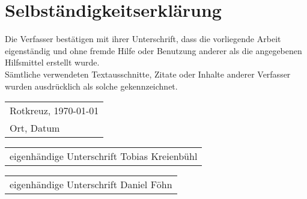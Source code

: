 \clearpage
\thispagestyle{empty}
\section*{Selbständigkeitserklärung}
Die Verfasser bestätigen mit ihrer Unterschrift, dass die vorliegende Arbeit eigenständig und ohne fremde Hilfe oder Benutzung anderer als die angegebenen Hilfsmittel erstellt wurde.\\Sämtliche verwendeten Textausschnitte, Zitate oder Inhalte anderer Verfasser wurden ausdrücklich als solche gekennzeichnet.

\vspace{2cm}
\begin{tabular}{@{}l@{}}
    Rotkreuz, \today\\
    Ort, Datum
\end{tabular}
\vspace{10cm}

\begin{tabular}{@{}l@{}}\hline
    eigenhändige Unterschrift Tobias Kreienbühl
\end{tabular}
\vspace{2cm}

\begin{tabular}{@{}l@{}}\hline
    eigenhändige Unterschrift Daniel Föhn
\end{tabular}
\vspace{2cm}

\clearpage